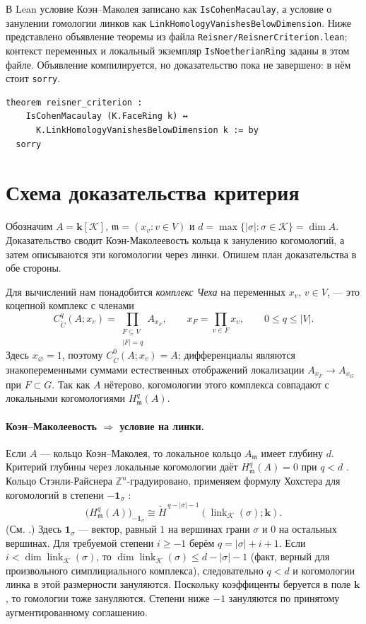 \documentclass[11pt]{amsart}
\begin{document}
В Lean условие Коэн--Маколея записано как \texttt{IsCohenMacaulay}, а
условие о занулении гомологии линков как
\texttt{LinkHomologyVanishesBelowDimension}. Ниже представлено объявление теоремы
из файла \texttt{Reisner/ReisnerCriterion.lean}; контекст переменных и
локальный экземпляр \texttt{IsNoetherianRing} заданы в этом файле. Объявление
компилируется, но доказательство пока не завершено: в нём стоит
\texttt{sorry}.

\begin{lstlisting}[style=leanstyle]
theorem reisner_criterion :
    IsCohenMacaulay (K.FaceRing k) ↔
      K.LinkHomologyVanishesBelowDimension k := by
  sorry
\end{lstlisting}

\section{Схема доказательства критерия}

Обозначим $A=\mathbf{k}[\mathcal{K}]$,
$\mathfrak m=(x_v:v\in V)$ и
$d=\max\{|\sigma|:\sigma\in\mathcal{K}\}=\dim A$.
Доказательство сводит Коэн-Маколеевость кольца к занулению
когомологий, а затем описываются эти когомологии через линки. Опишем план доказательства в обе стороны.

Для вычислений нам понадобится \textit{комплекс Чеха} на переменных $x_v$, $v\in V$, — это коцепной
комплекс с членами
\[
  C^q_{\check C}(A;x_v)
  =\prod_{\substack{F\subseteq V\\|F|=q}} A_{x_F},
  \qquad x_F=\prod_{v\in F}x_v,
  \qquad 0\leqslant q\leqslant |V|.
\]
Здесь $x_\varnothing=1$, поэтому $C^0_{\check C}(A;x_v)=A$;
дифференциалы являются знакопеременными суммами естественных отображений
локализации $A_{x_F}\to A_{x_G}$ при $F\subset G$. Так как $A$ нётерово,
когомологии этого комплекса совпадают с локальными когомологиями
$H^q_{\mathfrak m}(A)$.

\paragraph{\textbf{Коэн--Маколеевость $\Rightarrow$ условие на линки.}}
Если $A$ — кольцо Коэн--Маколея, то локальное кольцо $A_{\mathfrak m}$ имеет
глубину $d$. Критерий глубины через локальные когомологии даёт
$H^q_{\mathfrak m}(A)=0$ при $q<d$ \cite[Lemma~47.11.1]{StacksDepth}. Кольцо Стэнли-Райснера $\mathbb{Z}^n$-градуировано, применяем
формулу Хохстера для когомологий в степени $-\mathbf 1_\sigma$
:
\[
  \bigl(H^q_{\mathfrak m}(A)\bigr)_{-\mathbf 1_\sigma}
  \cong \widetilde H^{\,q-|\sigma|-1}
       (\operatorname{link}_{\mathcal{K}}(\sigma);\mathbf{k}).
\]
(См. \cite[Theorem~5.1]{Welker}.)
Здесь $\mathbf 1_\sigma$ — вектор, равный $1$ на вершинах грани $\sigma$
и $0$ на остальных вершинах. Для требуемой степени $i\geqslant -1$ берём
$q=|\sigma|+i+1$. Если
$i<\dim\operatorname{link}_{\mathcal{K}}(\sigma)$, то
$\dim\operatorname{link}_{\mathcal{K}}(\sigma)\leqslant d-|\sigma|-1$ (факт, верный для произвольного симплициального комплекса),
следовательно $q<d$ и когомологии линка в этой размерности зануляются. Поскольку коэффиценты беруется в поле $\mathbf{k}$, то гомологии тоже зануляются. Степени ниже $-1$ зануляются по принятому
аугментированному соглашению.
\end{document}
